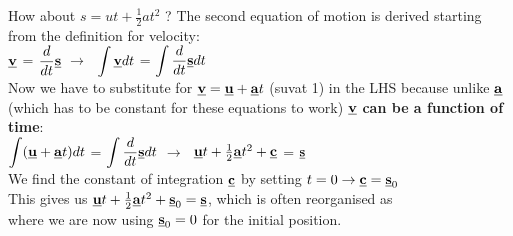 \begin{frame}{ How about $s = ut + \frac{1}{2}at^2$ ?}
\small
The second equation of motion is derived starting from the definition for velocity:\\[1ex]

\textcolor{blue}{$\displaystyle \underline{\mathbf{v}} $} = \textcolor{red}{$\displaystyle \frac{d}{dt}\underline{\mathbf{s}}$} $\rightarrow \;$  \textcolor{blue}{$\displaystyle \int \underline{\mathbf{v}} dt$} = \textcolor{red}{$ \displaystyle \int \frac{d}{dt}\underline{\mathbf{s}} dt$} \\[1ex]
Now we have to substitute for $\underline{\mathbf{v}} = \underline{\mathbf{u}}+\underline{\mathbf{a}}t$ (suvat 1) in the LHS because unlike $\underline{\mathbf{a}}$ (which has to be constant for these equations to work) $\underline{\mathbf{v}}$ \textbf{can be a function of time}:\\[1ex]

 \textcolor{blue}{$\displaystyle \int (\underline{\mathbf{u}} + \underline{\mathbf{a}}t) dt$} = \textcolor{red}{$ \displaystyle \int \frac{d}{dt} \underline{\mathbf{s}} dt$} $\rightarrow \;$  \textcolor{blue}{$\underline{\mathbf{u}}t + \frac{1}{2}\underline{\mathbf{a}}t^2 + \underline{\mathbf{c}}$} = \textcolor{red}{$\underline{\mathbf{s}}$} \\[1ex]


We find the constant of integration $\underline{\mathbf{c}}$ by setting $t = 0 \rightarrow \underline{\mathbf{c}} = \underline{\mathbf{s}}_0 $\\[1ex]

This gives us $\underline{\mathbf{u}}t + \frac{1}{2}\underline{\mathbf{a}}t^2 + \underline{\mathbf{s}}_0 = \underline{\mathbf{s}}$, which is often reorganised as \\[1ex]
where we are now using $\underline{\mathbf{s}}_0 =0$ for the initial position.\\[1ex]

\\[1ex]
\end{frame}



